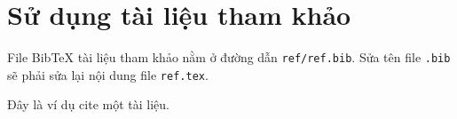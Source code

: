 \section{Sử dụng tài liệu tham khảo}

File BibTeX tài liệu tham khảo nằm ở đường dẫn \texttt{ref/ref.bib}. Sửa tên file \texttt{.bib} sẽ phải sửa lại nội dung file \texttt{ref.tex}.

Đây là ví dụ cite một tài liệu\cite{tutorial_paper}. \cite{concept}